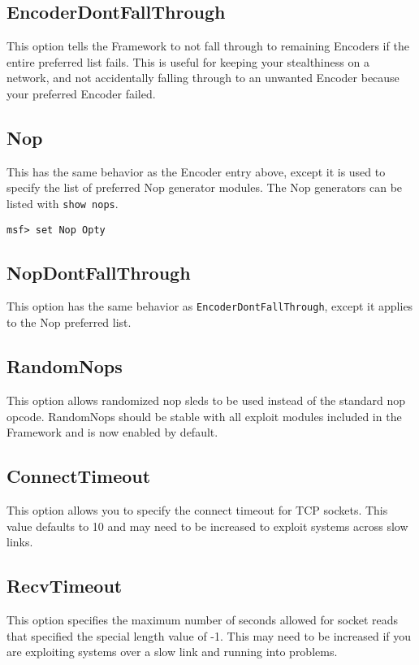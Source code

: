 \documentclass{report}
\begin{document}
	\subsection{EncoderDontFallThrough}
\par
This option tells the Framework to not fall through to remaining Encoders if the
entire preferred list fails.  This is useful for keeping your stealthiness on a
network, and not accidentally falling through to an unwanted Encoder because
your preferred Encoder failed.  

	\subsection{Nop}
\par
This has the same behavior as the Encoder entry above, except it is used to
specify the list of preferred Nop generator modules. The Nop generators can be
listed with \texttt{show nops}.  

\begin{verbatim}
msf> set Nop Opty
\end{verbatim}

	\subsection{NopDontFallThrough}
\par
This option has the same behavior as \texttt{EncoderDontFallThrough}, except it
applies to the Nop preferred list. 

	\subsection{RandomNops}
\par
This option allows randomized nop sleds to be used instead of the standard nop
opcode. RandomNops should be stable with all exploit modules included in the
Framework and is now enabled by default. 

	\subsection{ConnectTimeout}
\par
This option allows you to specify the connect timeout for TCP sockets. This
value defaults to 10 and may need to be increased to exploit systems across slow links. 

	\subsection{RecvTimeout}
\par
This option specifies the maximum number of seconds allowed for socket reads
that specified the special length value of -1. This may need to be increased if
you are exploiting systems over a slow link and running into problems. 
\end{document}
